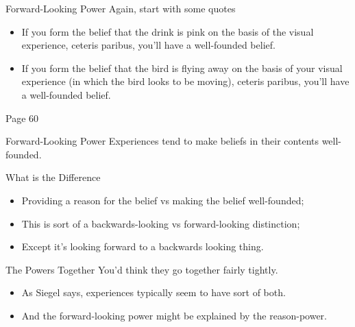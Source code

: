 \documentclass[
  17pt,
  letterpaper,
  ignorenonframetext,
  aspectratio=169,
  handout,
  xcolor={dvipsnames}]{beamer}
\providecommand{\tightlist}{%
  \setlength{\itemsep}{0pt}\setlength{\parskip}{0pt}}\usepackage{longtable,booktabs,array}
\begin{document}
\begin{frame}{Forward-Looking Power}
\protect\hypertarget{forward-looking-power}{}
Again, start with some quotes

\end{frame} \begin{frame}[plain]

\begin{itemize}[<+->]
\tightlist
\item
  If you form the belief that the drink is pink on the basis of the
  visual experience, ceteris paribus, you'll have a well-founded
  belief.\\
\item
  If you form the belief that the bird is flying away on the basis of
  your visual experience (in which the bird looks to be moving), ceteris
  paribus, you'll have a well-founded belief.
\end{itemize}

Page 60
\end{frame}

\begin{frame}{Forward-Looking Power}
\protect\hypertarget{forward-looking-power-1}{}
Experiences tend to make beliefs in their contents well-founded.
\end{frame}

\begin{frame}{What is the Difference}
\protect\hypertarget{what-is-the-difference}{}
\begin{itemize}[<+->]
\tightlist
\item
  Providing a reason for the belief vs making the belief well-founded;
\item
  This is sort of a backwards-looking vs forward-looking distinction;
\item
  Except it's looking forward to a backwards looking thing.
\end{itemize}
\end{frame}

\begin{frame}{The Powers Together}
\protect\hypertarget{the-powers-together}{}
You'd think they go together fairly tightly.

\begin{itemize}[<+->]
\tightlist
\item
  As Siegel says, experiences typically seem to have sort of both.
\item
  And the forward-looking power might be explained by the reason-power.
\end{itemize}
\end{frame}
\end{document}
